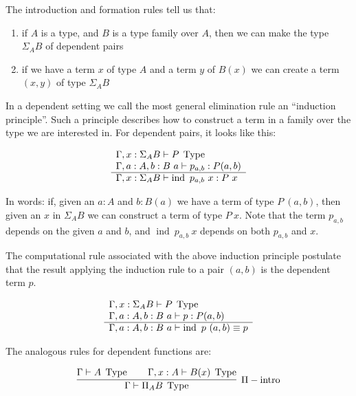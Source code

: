 The introduction and formation rules tell us that: 
\begin{enumerate}
\item if $A$ is a type, and $B$ is a type family over $A$,
  then we can make the type $\Sigma_A B$ of dependent pairs
\item if we have a term $x$ of type $A$ and a term $y$ of $B(x)$ we can create
    a term $(x,y)$ of type $\Sigma_A B$
\end{enumerate}

In a dependent setting we call the most general elimination rule an ``induction
principle''. Such a principle describes how to construct a term in a family
over the type we are interested in. For dependent pairs, it looks like this:

\begin{equation*}
  \begin{array}[t]{l}
    \Gamma, x : \Sigma_A B \vdash P \; \operatorname{Type}\\
    \Gamma, a : A, b : B~a \vdash p_{a,b} : P (a,b)\\
    \hline
    \Gamma, x : \Sigma_A B \vdash \operatorname{ind}~p_{a,b}~x : P~x
  \end{array}
\end{equation*}

In words: if, given an $a : A$ and $b : B (a)$ we have a term of type $P~(a,b)$,
then given an $x$ in $\Sigma_A B$ we can construct a term of type $P~x$. Note
that the term $p_{a,b}$ depends on the given $a$ and $b$, and $\operatorname{ind}~p_{a,b}~x$
depends on both $p_{a,b}$ and $x$.

The computational rule associated with the above induction principle postulate
that the result applying the induction rule to a pair $(a,b)$ is the dependent
term $p$.

\begin{equation*}
  \begin{array}[t]{l}
    \Gamma, x : \Sigma_A B \vdash P \; \operatorname{Type}\\
    \Gamma, a : A, b : B~a \vdash p : P (a,b)\\
    \hline
    \Gamma, a : A, b : B~a \vdash \operatorname{ind}~p~(a,b) \equiv p
  \end{array}
\end{equation*}

The analogous rules for dependent functions are:

\begin{equation*}
\infer[\Pi-\operatorname{intro}]
  {\Gamma \vdash \Pi_A B \; \Type}
  {\Gamma \vdash A \; \Type \qquad \Gamma, x:A \vdash B(x) \; \Type}
\end{equation*}

